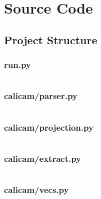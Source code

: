 \section{Source Code}

\subsection*{Project Structure}


\subsubsection*{run.py} \label{code:run}
\inputminted{python}{./calicam/run.py}

\subsubsection*{calicam/parser.py} \label{code:parser}
\inputminted{python}{./calicam/calicam/parser.py}

\subsubsection*{calicam/projection.py} \label{code:projection}
\inputminted{python}{./calicam/calicam/projection.py}

\subsubsection*{calicam/extract.py} \label{code:extract}
\inputminted{python}{./calicam/calicam/extract.py}

\subsubsection*{calicam/vecs.py} \label{code:vecsZ}
\inputminted{python}{./calicam/calicam/vecs.py}
